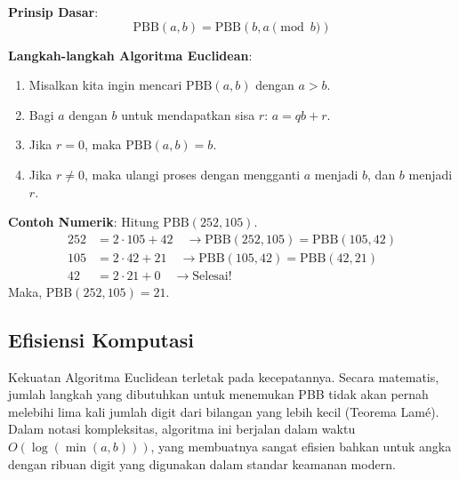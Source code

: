 \textbf{Prinsip Dasar}:
\[ \text{PBB}(a, b) = \text{PBB}(b, a \pmod{b}) \]

\textbf{Langkah-langkah Algoritma Euclidean}:
\begin{enumerate}
    \item Misalkan kita ingin mencari $\text{PBB}(a, b)$ dengan $a > b$.
    \item Bagi $a$ dengan $b$ untuk mendapatkan sisa $r$: $a = qb + r$.
    \item Jika $r = 0$, maka $\text{PBB}(a, b) = b$.
    \item Jika $r \neq 0$, maka ulangi proses dengan mengganti $a$ menjadi $b$, dan $b$ menjadi $r$.
\end{enumerate}

\textbf{Contoh Numerik}: Hitung $\text{PBB}(252, 105)$.
\begin{align*}
    252 &= 2 \cdot 105 + 42 \quad \rightarrow \text{PBB}(252, 105) = \text{PBB}(105, 42) \\
    105 &= 2 \cdot 42 + 21 \quad \rightarrow \text{PBB}(105, 42) = \text{PBB}(42, 21) \\
    42 &= 2 \cdot 21 + 0 \quad \rightarrow \text{Selesai!}
\end{align*}
Maka, $\text{PBB}(252, 105) = 21$.

\subsection{Efisiensi Komputasi}

Kekuatan Algoritma Euclidean terletak pada kecepatannya. Secara matematis, jumlah langkah yang dibutuhkan untuk menemukan PBB tidak akan pernah melebihi lima kali jumlah digit dari bilangan yang lebih kecil (Teorema Lamé). Dalam notasi kompleksitas, algoritma ini berjalan dalam waktu $O(\log(\min(a, b)))$, yang membuatnya sangat efisien bahkan untuk angka dengan ribuan digit yang digunakan dalam standar keamanan modern.
